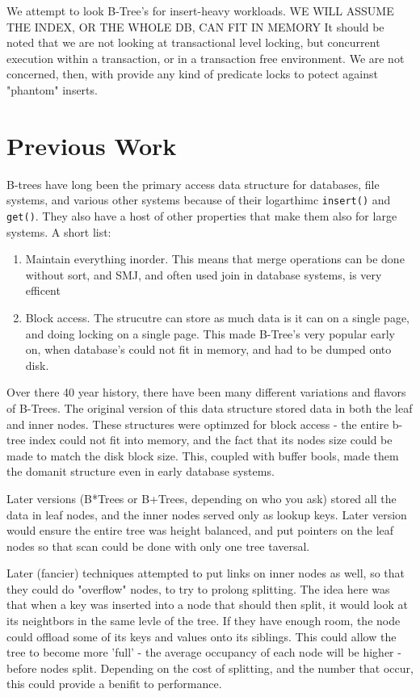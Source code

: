 \documentclass{sig-alternate}
\begin{document}
We attempt to look B-Tree's for insert-heavy workloads. WE WILL ASSUME THE INDEX, OR THE WHOLE DB, CAN FIT IN MEMORY
It should be noted that we are not looking at transactional level locking, but concurrent execution within a transaction, or in a transaction free environment.  We are not concerned, then, with provide any kind of predicate locks to potect against "phantom" inserts.

\section{Previous Work}
B-trees have long been the primary access data structure for databases, file systems, and various other systems because of their logarthimc \texttt{insert()} and \texttt{get()}.
They also have a host of other properties that make them also for large systems.  A short list: 
\begin{enumerate}
\item Maintain everything inorder.  This means that merge operations can be done without sort, and SMJ, and often used join in database systems, is very efficent
\item Block access.  The strucutre can store as much data is it can on a single page, and doing locking on a single page.  This made B-Tree's very popular early on, when database's could not fit in memory, and had to be dumped onto disk.
\end{enumerate}

Over there 40 year history, there have been many different variations and flavors of B-Trees.  The original version of this data structure stored data in both the leaf and inner nodes.  These structures were optimzed for block access - the entire b-tree index could not fit into memory, and the fact that its nodes size could be made to match the disk block size.  This, coupled with buffer bools, made them the domanit structure even in early database systems.

Later versions (B*Trees or B+Trees, depending on who you ask) stored all the data in leaf nodes, and the inner nodes served only as lookup keys.  Later version would ensure the entire tree was height balanced, and put pointers on the leaf nodes so that scan could be done with only one tree taversal.  

Later (fancier) techniques attempted to put links on inner nodes as well, so that they could do "overflow" nodes, to try to prolong splitting.  The idea here was that when a key was inserted into a node that should then split, it would look at its neightbors in the same levle of the tree. If they have enough room, the node could offload some of its keys and values onto its siblings.  This could allow the tree to become more 'full' - the average occupancy of each node will be higher - before nodes split.  Depending on the cost of splitting, and the number that occur, this could provide a benifit to performance.
\end{document}
